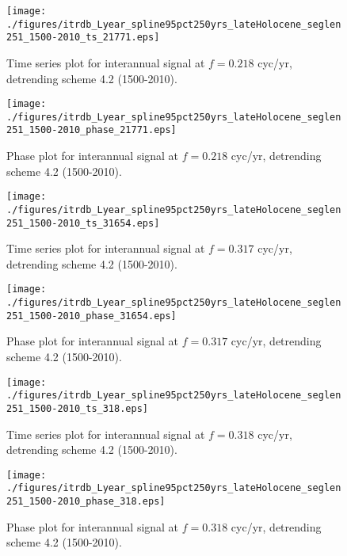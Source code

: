 \documentclass[phd,tocprelim]{cornell}
\begin{document}
\begin{figure}[!tbp]
\centering
\begin{minipage}[b]{0.45\textwidth}
\texttt{[image: ./figures/itrdb\_Lyear\_spline95pct250yrs\_lateHolocene\_seglen251\_1500-2010\_ts\_21771.eps]}
\caption{Time series plot for interannual signal at $f=0.218$ cyc/yr, detrending scheme 4.2 (1500-2010).}
\label{ts4.2p2}
\end{minipage}
\hfill
\begin{minipage}[b]{0.45\textwidth}
\texttt{[image: ./figures/itrdb\_Lyear\_spline95pct250yrs\_lateHolocene\_seglen251\_1500-2010\_phase\_21771.eps]}
\caption{Phase plot for interannual signal at $f=0.218$ cyc/yr, detrending scheme 4.2 (1500-2010).}
\label{map4.2p2}
\end{minipage}
\end{figure}

\begin{figure}[!tbp]
\centering
\begin{minipage}[b]{0.45\textwidth}
\texttt{[image: ./figures/itrdb\_Lyear\_spline95pct250yrs\_lateHolocene\_seglen251\_1500-2010\_ts\_31654.eps]}
\caption{Time series plot for interannual signal at $f=0.317$ cyc/yr, detrending scheme 4.2 (1500-2010).}
\label{ts4.2p3}
\end{minipage}
\hfill
\begin{minipage}[b]{0.45\textwidth}
\texttt{[image: ./figures/itrdb\_Lyear\_spline95pct250yrs\_lateHolocene\_seglen251\_1500-2010\_phase\_31654.eps]}
\caption{Phase plot for interannual signal at $f=0.317$ cyc/yr, detrending scheme 4.2 (1500-2010).}
\label{map4.2p3}
\end{minipage}
\end{figure}

\begin{figure}[!tbp]
\centering
\begin{minipage}[b]{0.45\textwidth}
\texttt{[image: ./figures/itrdb\_Lyear\_spline95pct250yrs\_lateHolocene\_seglen251\_1500-2010\_ts\_318.eps]}
\caption{Time series plot for interannual signal at $f=0.318$ cyc/yr, detrending scheme 4.2 (1500-2010).}
\label{ts4.2p4}
\end{minipage}
\hfill
\begin{minipage}[b]{0.45\textwidth}
\texttt{[image: ./figures/itrdb\_Lyear\_spline95pct250yrs\_lateHolocene\_seglen251\_1500-2010\_phase\_318.eps]}
\caption{Phase plot for interannual signal at $f=0.318$ cyc/yr, detrending scheme 4.2 (1500-2010).}
\label{map4.2p4}
\end{minipage}
\end{figure}
\end{document}
